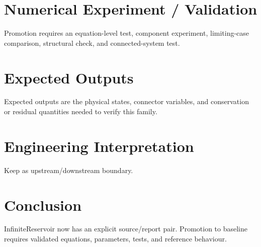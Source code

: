 \documentclass[10pt,a4paper]{article}
\begin{document}
\section{Numerical Experiment / Validation}
Promotion requires an equation-level test, component experiment, limiting-case comparison, structural check, and connected-system test.
\section{Expected Outputs}
Expected outputs are the physical states, connector variables, and conservation or residual quantities needed to verify this family.
\section{Engineering Interpretation}
Keep as upstream/downstream boundary.
\section*{Conclusion}
InfiniteReservoir now has an explicit source/report pair. Promotion to baseline requires validated equations, parameters, tests, and reference behaviour.
\end{document}
